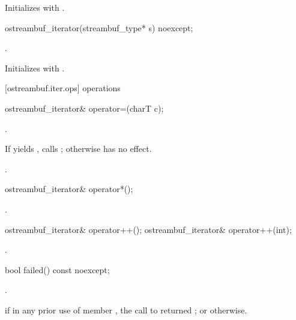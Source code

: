 \begin{itemdescr}
\pnum
\effects
Initializes  with .
\end{itemdescr}

%
\begin{itemdecl}
ostreambuf_iterator(streambuf_type* s) noexcept;
\end{itemdecl}

\begin{itemdescr}
\pnum
\requires
{}.

\pnum
\effects
Initializes  with .
\end{itemdescr}

[ostreambuf.iter.ops]{ operations}

%
\begin{itemdecl}
ostreambuf_iterator&
  operator=(charT c);
\end{itemdecl}

\begin{itemdescr}
\pnum
\requires {}.

\pnum
\effects
If
yields
,
calls
;
otherwise has no effect.

\pnum
\returns
{}.
\end{itemdescr}

%
\begin{itemdecl}
ostreambuf_iterator& operator*();
\end{itemdecl}

\begin{itemdescr}
\pnum
\returns
{}.
\end{itemdescr}

%
\begin{itemdecl}
ostreambuf_iterator& operator++();
ostreambuf_iterator& operator++(int);
\end{itemdecl}

\begin{itemdescr}
\pnum
\returns
{}.
\end{itemdescr}

%
\begin{itemdecl}
bool failed() const noexcept;
\end{itemdecl}

\begin{itemdescr}
\pnum
\requires {}.

\pnum
\returns
{}
if in any prior use of member
,
the call to
returned
;
or
otherwise.
\end{itemdescr}
